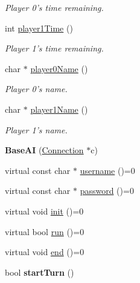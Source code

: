 \begin{DoxyCompactItemize}
\begin{DoxyCompactList}\small\item\em Player 0's time remaining. \item\end{DoxyCompactList}\item 
\hypertarget{classBaseAI_a5a96b2451bf0e2f6567e9e56d59cf7cb}{
int \hyperlink{classBaseAI_a5a96b2451bf0e2f6567e9e56d59cf7cb}{player1Time} ()}
\label{classBaseAI_a5a96b2451bf0e2f6567e9e56d59cf7cb}

\begin{DoxyCompactList}\small\item\em Player 1's time remaining. \item\end{DoxyCompactList}\item 
\hypertarget{classBaseAI_a92f2bd6e6d2acdab0a3d5749fc6d6ca8}{
char $\ast$ \hyperlink{classBaseAI_a92f2bd6e6d2acdab0a3d5749fc6d6ca8}{player0Name} ()}
\label{classBaseAI_a92f2bd6e6d2acdab0a3d5749fc6d6ca8}

\begin{DoxyCompactList}\small\item\em Player 0's name. \item\end{DoxyCompactList}\item 
\hypertarget{classBaseAI_a806ae8a1459d856a4b66e493a54a1b9a}{
char $\ast$ \hyperlink{classBaseAI_a806ae8a1459d856a4b66e493a54a1b9a}{player1Name} ()}
\label{classBaseAI_a806ae8a1459d856a4b66e493a54a1b9a}

\begin{DoxyCompactList}\small\item\em Player 1's name. \item\end{DoxyCompactList}\item 
\hypertarget{classBaseAI_a3f2806936e6e65d76218e04b057e05f4}{
{\bfseries BaseAI} (\hyperlink{structConnection}{Connection} $\ast$c)}
\label{classBaseAI_a3f2806936e6e65d76218e04b057e05f4}

\item 
virtual const char $\ast$ \hyperlink{classBaseAI_aef082fbf306fec04515ed5ed3b1ba582}{username} ()=0
\item 
virtual const char $\ast$ \hyperlink{classBaseAI_a9251e20447917cda64ad1487b903456f}{password} ()=0
\item 
virtual void \hyperlink{classBaseAI_a90ce8becd6f2e32c2cc32d41145e88df}{init} ()=0
\item 
virtual bool \hyperlink{classBaseAI_ad60148e7e9e450ce47432b07b4db1ed6}{run} ()=0
\item 
virtual void \hyperlink{classBaseAI_a60c8246a859ba2dba84b70239bc129bc}{end} ()=0
\item 
\hypertarget{classBaseAI_ac6303df0fece47e29b77dd0aa0aa4fe8}{
bool {\bfseries startTurn} ()}
\label{classBaseAI_ac6303df0fece47e29b77dd0aa0aa4fe8}

\end{DoxyCompactItemize}
